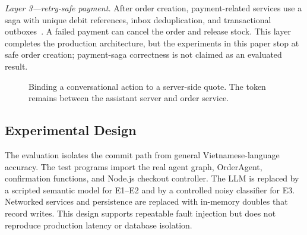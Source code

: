 \documentclass{IEEEtran}
\begin{document}
\textit{Layer 3---retry-safe payment.} After order creation, payment-related services use a saga with unique debit references, inbox deduplication, and transactional outboxes~\cite{richardson2018microservices}. A failed payment can cancel the order and release stock. This layer completes the production architecture, but the experiments in this paper stop at safe order creation; payment-saga correctness is not claimed as an evaluated result.

\begin{figure}[t]
\centering
{}
\caption{Binding a conversational action to a server-side quote. The token remains between the assistant server and order service.}
\label{fig:sequence}
\end{figure}

\subsection{Experimental Design}

The evaluation isolates the commit path from general Vietnamese-language accuracy. The test programs import the real agent graph, OrderAgent, confirmation functions, and Node.js checkout controller. The LLM is replaced by a scripted semantic model for E1--E2 and by a controlled noisy classifier for E3. Networked services and persistence are replaced with in-memory doubles that record writes. This design supports repeatable fault injection but does not reproduce production latency or database isolation.
\end{document}
